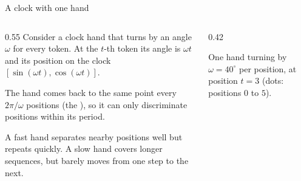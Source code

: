 \begin{frame}{A clock with one hand}

    \vspace{1em}
    \begin{columns}[c,onlytextwidth]
        \begin{column}{0.55\textwidth}%
            \setlength{\parskip}{6pt}%
            \RaggedRight\setlength{\parindent}{0pt}%
            Consider a clock hand that turns by an angle $\omega$ for every token. At the $t$-th token its angle is $\omega t$ and its position on the clock $[\sin(\omega t),\cos(\omega t)]$.

            The hand comes back to the same point every $2\pi/\omega$ positions (the ), so it can only discriminate positions within its period.

            A fast hand separates nearby positions well but repeats quickly. A slow
            hand covers longer sequences, but barely moves from one step to the
            next.
        \end{column}
        \begin{column}{0.42\textwidth}
            \centering
            \par{\scriptsize One hand turning by $\omega=40^\circ$ per position, at
                position $t=3$ (dots: positions $0$ to $5$).\par}
        \end{column}
    \end{columns}

\end{frame}

